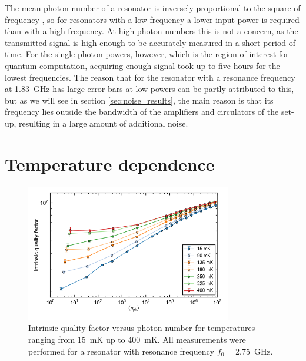 The mean photon number of a resonator is inversely proportional to the square of frequency \cite{bruno2015reducing}, so for resonators with a low frequency a lower input power is required than with a high frequency. At high photon numbers this is not a concern, as the transmitted signal is high enough to be accurately measured in a short period of time. For the single-photon powers, however, which is the region of interest for quantum computation, acquiring enough signal took up to five hours for the lowest frequencies. The reason that for the resonator with a resonance frequency at \SI{1.83}{\giga \hertz} has large error bars at low powers can be partly attributed to this, but as we will see in section \ref{sec:noise_results}, the main reason is that its frequency lies outside the bandwidth of the amplifiers and circulators of the set-up, resulting in a large amount of additional noise.





\section{Temperature dependence}
\label{sec:resonator:results:emperature_dependence}
\begin{figure}
    \centering
    \includegraphics[width=0.8\textwidth]{Figures/DRIE/Qi_vs_n_photon_temperature_dependence.png}
    \caption{Intrinsic quality factor versus photon number for temperatures ranging from \SI{15}{\milli \kelvin} up to \SI{400}{\milli \kelvin}. All measurements were performed for a resonator with resonance frequency $f_0 = $\SI{2.75}{\giga \hertz}.}
    \label{fig:Qi_vs_n_photon_temperature_dependence}
\end{figure}

